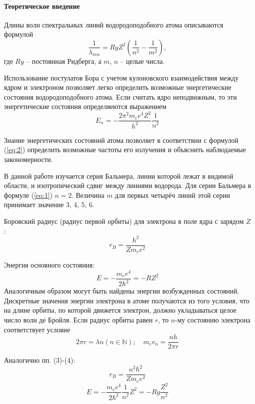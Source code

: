 \documentclass[a4paper, 12pt]{article}
\begin{document}
\paragraph{Теоретическое введение}
Длины волн спектральных линий водородоподобного атома описываются формулой
\begin{equation}
    \frac{1}{\lambda_{mn}}=RyZ^2\left(\frac{1}{n^2}-\frac{1}{m^2}\right),
    \label{eq:1}
\end{equation}
где $Ry$ -- постоянная Ридберга, а $m$, $n$ -- целые числа.\par
Использование постулатов Бора с учетом кулоновского взаимодействия между ядром и электроном позволяет легко определить возможные энергетические состояния водородоподобного атома. Если считать ядро неподвижным, то эти энергетические состояния определяеются выражением
\begin{equation}
    E_n=-\frac{2\pi^2m_ee^4Z^2}{h^2}\frac{1}{n^2}
    \label{eq:2}
\end{equation}
\par
Знание энергетических состояний атома позволяет в соответствии с формулой (\ref{eq:2}) определить возможные частоты его излучения и объяснить наблюдаемые закономерности.\par
В данной работе изучается серия Бальмера, линии которой лежат в видимой области, и изотропический сдвиг между линиями водорода. Для серии Бальмера в формуле (\ref{eq:1}) $n=2$. Величина $m$ для первых четырёч линий этой серии принимает значение 3, 4, 5, 6.\par
Боровский радиус (радиус первой орбиты) для электрона в поле ядра с зарядом $Z$:
\begin{equation}
    r_B=\frac{h^2}{Zm_ee^2}
\end{equation}
\par
Энергия основного состояния:
\begin{equation}
    E=-\frac{m_ee^4}{2\hbar^2}=-RZ^2
\end{equation}
Аналогичным образом могут быть найдены энергии возбужденных состояний. Дискретные значения энергии электрона в атоме получаются из того условия, что на длине орбиты, по которой движется электрон, должно укладываться целое число волн де Бройля. Если радиус орбиты равен $r$, то $n$-му состоянию электрона соответствует условие
\begin{equation}
    2\pi r=\lambda n\left(n\in\mathbb{N}\right);\quad m_ev_n=\frac{nh}{2\pi r}
\end{equation}
\par
Аналогично пп. (3)-(4):
\begin{equation}
    r_B=\frac{n^2\hbar^2}{Zm_ee^2}
\end{equation}
\begin{equation}
    E=-\frac{m_ee^4}{2\hbar^2}\frac{1}{n^2}Z^2=-Ry\frac{Z^2}{n^2}
\end{equation}
\end{document}
